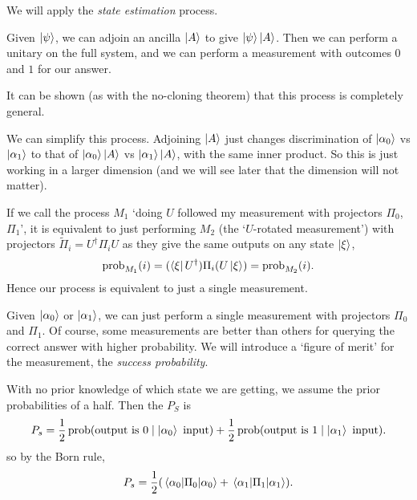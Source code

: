 \documentclass[a4paper]{article}
\begin{document}
We will apply the \emph{state estimation} process.

Given $\ket{\psi}$, we can adjoin an ancilla $\ket{A}$ to give $\ket{\psi}\ket{A}$. Then we can perform a unitary on the full system, and we can perform a measurement with outcomes $0$ and $1$ for our answer.

\begin{remark}
	It can be shown (as with the no-cloning theorem) that this process is completely general.
\end{remark}

We can simplify this process. Adjoining $\ket{A}$ just changes discrimination of $\ket{\alpha_0}$ vs $\ket{\alpha_1}$ to that of $\ket{\alpha_0}\ket{A}$ vs $\ket{\alpha_1}\ket{A}$, with the same inner product. So this is just working in a larger dimension (and we will see later that the dimension will not matter).

If we call the process $M_1$ `doing $U$ followed my measurement with projectors $\Pi_0$, $\Pi_1$', it is equivalent to just performing $M_2$ (the `$U$-rotated measurement') with projectors $\tilde{\Pi}_i = U^{\dagger} \Pi_i U$ as they give the same outputs on any state $\ket{\xi}$,
\begin{align*}
	\operatorname{prob}_{M_1}(i) = (\bra{\xi}U^{\dagger})\Pi_i (U \ket{\xi}) = \operatorname{prob}_{M_2}(i).
\end{align*}
Hence our process is equivalent to just a single measurement. 

Given $\ket{\alpha_0}$ or $\ket{\alpha_1}$, we can just perform a single measurement with projectors $\Pi_0$ and $\Pi_1$. Of course, some measurements are better than others for querying the correct answer with higher probability. We will introduce a `figure of merit' for the measurement, the \emph{success probability}.

\begin{definition}
	With no prior knowledge of which state we are getting, we assume the prior probabilities of a half. Then the  $P_S$ is
	$$
	P_s = \frac{1}{2}\operatorname{prob}(\text{output is }0 \mid \ket{\alpha_0}\text{ input}) + \frac{1}{2}\operatorname{prob}(\text{output is }1 \mid \ket{\alpha_1}\text{ input}).
	$$
	so by the Born rule,
$$
P_s = \frac{1}{2}(\ev{\Pi_0}{\alpha_0} + \ev{\Pi_1}{\alpha_1}).
$$
\end{definition}
\end{document}
